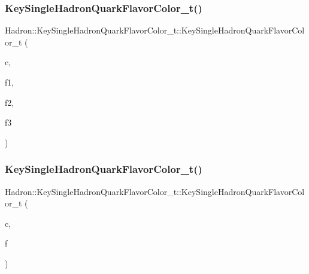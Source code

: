 \subsubsection{\texorpdfstring{KeySingleHadronQuarkFlavorColor\_t()}{KeySingleHadronQuarkFlavorColor\_t()}\hspace{0.1cm}{\footnotesize\ttfamily [9/10]}}
{\footnotesize\ttfamily Hadron\+::\+Key\+Single\+Hadron\+Quark\+Flavor\+Color\+\_\+t\+::\+Key\+Single\+Hadron\+Quark\+Flavor\+Color\+\_\+t (\begin{DoxyParamCaption}\item[{const std\+::string \&}]{c,  }\item[{const \mbox{\hyperlink{structHadron_1_1SingleHadronQuarkFlavor__t}{Single\+Hadron\+Quark\+Flavor\+\_\+t}} \&}]{f1,  }\item[{const \mbox{\hyperlink{structHadron_1_1SingleHadronQuarkFlavor__t}{Single\+Hadron\+Quark\+Flavor\+\_\+t}} \&}]{f2,  }\item[{const \mbox{\hyperlink{structHadron_1_1SingleHadronQuarkFlavor__t}{Single\+Hadron\+Quark\+Flavor\+\_\+t}} \&}]{f3 }\end{DoxyParamCaption})\hspace{0.3cm}{\ttfamily [inline]}}

\mbox{\label{structHadron_1_1KeySingleHadronQuarkFlavorColor__t_aa894166327f6565a8ec49fd863dadf47}} 
\subsubsection{\texorpdfstring{KeySingleHadronQuarkFlavorColor\_t()}{KeySingleHadronQuarkFlavorColor\_t()}\hspace{0.1cm}{\footnotesize\ttfamily [10/10]}}
{\footnotesize\ttfamily Hadron\+::\+Key\+Single\+Hadron\+Quark\+Flavor\+Color\+\_\+t\+::\+Key\+Single\+Hadron\+Quark\+Flavor\+Color\+\_\+t (\begin{DoxyParamCaption}\item[{const std\+::string \&}]{c,  }\item[{const \mbox{\hyperlink{classADAT_1_1Array1dO}{Array1dO}}$<$ \mbox{\hyperlink{structHadron_1_1SingleHadronQuarkFlavor__t}{Single\+Hadron\+Quark\+Flavor\+\_\+t}} $>$ \&}]{f }\end{DoxyParamCaption})\hspace{0.3cm}{\ttfamily [inline]}}




